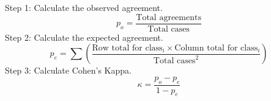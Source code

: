 \documentclass[preview]{standalone}
\begin{document}
Step 1: Calculate the observed agreement.
{\Large
\[
p_o=\frac{\text{Total agreements}}{\text{Total cases}}
\]
}
Step 2: Calculate the expected agreement.
{\large
\[
p_e=\sum\left(\frac{\text{Row total for class}_i\times\text{Column total for class}_i}{\text{Total cases}^2}\right)
\]
}
Step 3: Calculate Cohen's Kappa.
{\Large
\[
\kappa=\frac{p_o-p_e}{1-p_e}
\]
}
\end{document}
